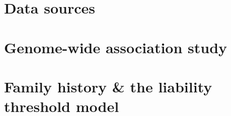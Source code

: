 \section{Data sources}




\section{Genome-wide association study}\label{sec:GWAS}


%

\section{Family history \& the liability threshold model}








